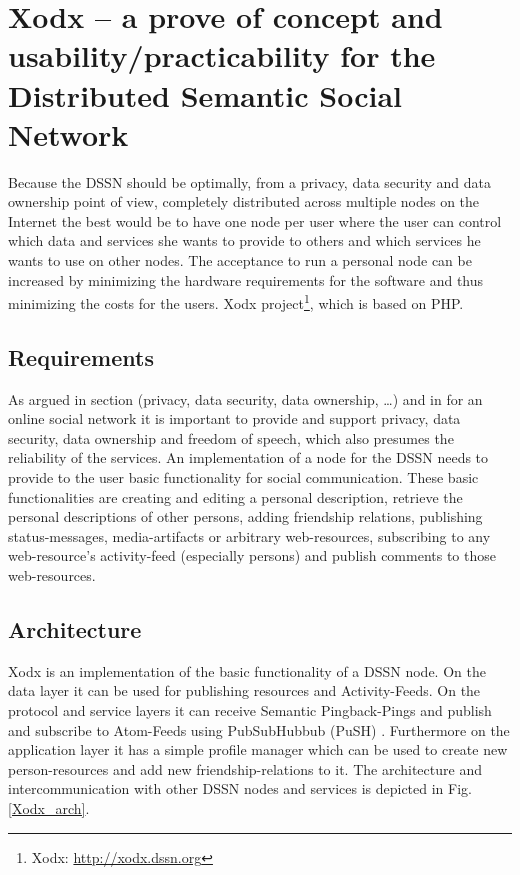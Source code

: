 \documentclass{llncs}
\begin{document}
\section{Xodx – a prove of concept and usability/practicability for the Distributed Semantic Social Network}
Because the DSSN should be optimally, from a privacy, data security and data ownership point of view, completely distributed across multiple nodes on the Internet the best would be to have one node per user where the user can control which data and services she wants to provide to others and which services he wants to use on other nodes.
The acceptance to run a personal node can be increased by minimizing the hardware requirements for the software and thus minimizing the costs for the users.
Xodx project\footnote{Xodx: \url{http://xodx.dssn.org}}, which is based on PHP.

\subsection{Requirements}
As argued in section (privacy, data security, data ownership, …) and in \cite{tramp-s-2012--a} for an online social network it is important to provide and support privacy, data security, data ownership and freedom of speech, which also presumes the reliability of the services.
An implementation of a node for the DSSN needs to provide to the user basic functionality for social communication. 
These basic functionalities are creating and editing a personal description, retrieve the personal descriptions of other persons, adding friendship relations, publishing status-messages, media-artifacts or arbitrary web-resources, subscribing to any web-resource's activity-feed (especially persons) and publish comments to those web-resources.

\subsection{Architecture}
Xodx is an implementation of the basic functionality of a DSSN node.
On the data layer it can be used for publishing resources and Activity-Feeds.
On the protocol and service layers it can receive Semantic Pingback-Pings and publish and subscribe to Atom-Feeds using PubSubHubbub (PuSH) .
Furthermore on the application layer it has a simple profile manager which can be used to create new person-resources and add new friendship-relations to it.
The architecture and intercommunication with other DSSN nodes and services is depicted in Fig. \ref{Xodx_arch}.
\end{document}
